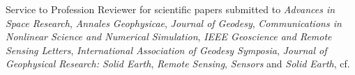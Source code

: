 

\begin{cvtext}{Service to Profession}
Reviewer for scientific papers submitted to 
\emph{Advances in Space Research}, 
\emph{Annales Geophysicae}, 
\emph{Journal of Geodesy}, 
\emph{Communications in Nonlinear Science and Numerical Simulation}, 
\emph{IEEE Geoscience and Remote Sensing Letters}, 
\emph{International Association of Geodesy Symposia}, 
\emph{Journal of Geophysical Research: Solid Earth}, 
\emph{Remote Sensing}, 
\emph{Sensors} and 
\emph{Solid Earth},
cf. \\
\end{cvtext}